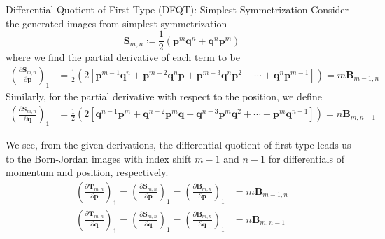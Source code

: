 \documentclass[aspectratio=169]{beamer}
\begin{document}
	\begin{frame}[allowframebreaks]{Differential Quotient of First-Type (DFQT): Simplest Symmetrization}
		Consider the generated images from simplest symmetrization
		\begin{equation}
			\textbf{S}_{m,n}\coloneqq\frac{1}{2}(\textbf{p}^m\textbf{q}^n+\textbf{q}^n\textbf{p}^m)
		\end{equation}
		where we find the partial derivative of each term to be
		\begin{align}
			\left( \frac{\partial\textbf{S}_{m,n}}{\partial\textbf{p}}\right)_1&=\frac{1}{2}\left(2[\textbf{p}^{m-1}\textbf{q}^n+\textbf{p}^{m-2}\textbf{q}^n\textbf{p}+\textbf{p}^{m-3}\textbf{q}^n\textbf{p}^2+\cdots+\textbf{q}^n\textbf{p}^{m-1}]\right)=m\textbf{B}_{m-1,n}
		\end{align}
		Similarly, for the partial derivative with respect to the position, we define
		\begin{align}
			\left( \frac{\partial\textbf{S}_{m,n}}{\partial\textbf{q}}\right)_1&=\frac{1}{2}\left(2[\textbf{q}^{n-1}\textbf{p}^m+\textbf{q}^{n-2}\textbf{p}^m\textbf{q}+\textbf{q}^{n-3}\textbf{p}^m\textbf{q}^2+\cdots+\textbf{p}^m\textbf{q}^{n-1}]\right)=n\textbf{B}_{m,n-1}
		\end{align}
		
		We see, from the given derivations, the differential quotient of first type leads us to the Born-Jordan images with index shift $m-1$ and $n-1$ for differentials of momentum and position, respectively.
		\begin{eqnarray}
			\left(\frac{\partial\textbf{T}_{m,n}}{\partial\textbf{p}}\right)_1=\left(\frac{\partial\textbf{S}_{m,n}}{\partial\textbf{p}}\right)_1=\left(\frac{\partial\textbf{B}_{m,n}}{\partial\textbf{p}}\right)_1&=m\textbf{B}_{m-1,n} \\
			\left(\frac{\partial\textbf{T}_{m,n}}{\partial\textbf{q}}\right)_1=\left(\frac{\partial\textbf{S}_{m,n}}{\partial\textbf{q}}\right)_1=\left(\frac{\partial\textbf{B}_{m,n}}{\partial\textbf{q}}\right)_1&=n\textbf{B}_{m,n-1}
		\end{eqnarray}
	\end{frame}
	
\end{document}
